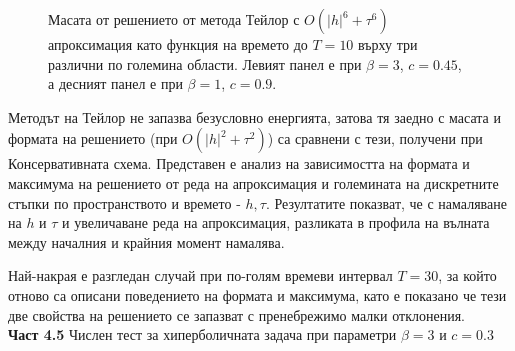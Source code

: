 \documentclass[a5paper]{article}
\theoremstyle{remark}
\begin{document}
\begin{large}
\begin{figure}[ht]
\begin{minipage}[b]{0.51\linewidth}
	\end{minipage}
\caption{Масата от решението от метода Тейлор с $O(|h|^6 + \tau^6)$ апроксимация като функция на времето до $T=10$ върху три различни по големина области. Левият панел е при $\beta =  3$, $c = 0.45$, а десният панел е при $\beta =  1$, $c = 0.9$.}
\label{Test1_2Mass}
\end{figure}
\FloatBarrier
Методът на Тейлор не запазва безусловно енергията, затова тя заедно с масата и формата на решението (при $O(|h|^2 + \tau^2)$) са сравнени с тези, получени при Консервативната схема. Представен е анализ на зависимостта на формата и максимума на решението от реда на апроксимация и големината на дискретните стъпки по пространството и времето - $h, \tau$. Резултатите показват, че с намаляване на $h$ и $\tau$ и увеличаване реда на апроксимация, разликата в профила на вълната между началния и крайния момент намалява. 

Най-накрая е разгледан случай при по-голям времеви интервал $T=30$, за който отново са описани поведението на формата и максимума, като е показано че тези две свойства на решението се запазват с пренебрежимо малки отклонения.\\

\textbf{Част 4.5} Числен тест за хиперболичната задача при параметри $\beta = 3$ и $c=0.3$


\end{large}
\end{document}
